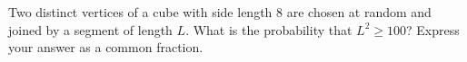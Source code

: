 Two distinct vertices of a cube with side length \(8\) are chosen at random and joined by a segment of length \(L\). What is the probability that \(L^2\ge100\)? Express your answer as a common fraction.
